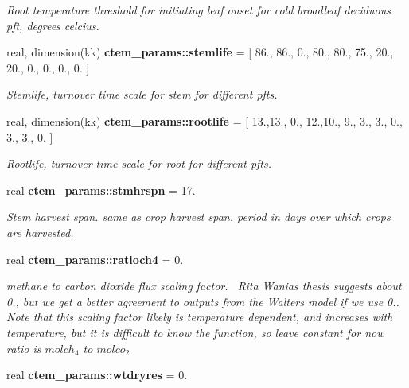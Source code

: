 \begin{DoxyCompactItemize}
\begin{DoxyCompactList}\small\item\em Root temperature threshold for initiating leaf onset for cold broadleaf deciduous pft, degrees celcius. \end{DoxyCompactList}\item 
\hypertarget{namespacectem__params_abc90906c9c70649408c5ad72dd96ce35}{}real, dimension(kk) {\bfseries ctem\+\_\+params\+::stemlife} = \mbox{[} 86., 86., 0., 80., 80., 75., 20., 20., 0., 0., 0., 0. \mbox{]}\label{namespacectem__params_abc90906c9c70649408c5ad72dd96ce35}

\begin{DoxyCompactList}\small\item\em Stemlife, turnover time scale for stem for different pfts. \end{DoxyCompactList}\item 
\hypertarget{namespacectem__params_ad7b9c1585fd85afce280c21bf6f090c9}{}real, dimension(kk) {\bfseries ctem\+\_\+params\+::rootlife} = \mbox{[} 13.,13., 0., 12.,10., 9., 3., 3., 0., 3., 3., 0. \mbox{]}\label{namespacectem__params_ad7b9c1585fd85afce280c21bf6f090c9}

\begin{DoxyCompactList}\small\item\em Rootlife, turnover time scale for root for different pfts. \end{DoxyCompactList}\item 
\hypertarget{namespacectem__params_ae5c80ee006ea823900274412778709cf}{}real {\bfseries ctem\+\_\+params\+::stmhrspn} = 17.\label{namespacectem__params_ae5c80ee006ea823900274412778709cf}

\begin{DoxyCompactList}\small\item\em Stem harvest span. same as crop harvest span. period in days over which crops are harvested. \end{DoxyCompactList}\item 
\hypertarget{namespacectem__params_a34074497065d6cb2b9177c3fc400dcf3}{}real {\bfseries ctem\+\_\+params\+::ratioch4} = 0.\label{namespacectem__params_a34074497065d6cb2b9177c3fc400dcf3}

\begin{DoxyCompactList}\small\item\em methane to carbon dioxide flux scaling factor.~\newline
Rita Wania\textquotesingle{}s thesis suggests about 0., but we get a better agreement to outputs from the Walter\textquotesingle{}s model if we use 0.. Note that this scaling factor likely is temperature dependent, and increases with temperature, but it is difficult to know the function, so leave constant for now ratio is $mol ch_4$ to $mol co_2$ \end{DoxyCompactList}\item 
\hypertarget{namespacectem__params_a71227aca2a1e2963319a981847fa2874}{}real {\bfseries ctem\+\_\+params\+::wtdryres} = 0.\label{namespacectem__params_a71227aca2a1e2963319a981847fa2874}


\end{DoxyCompactItemize}

